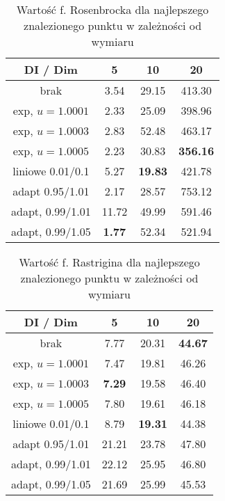 \documentclass[12pt]{article}
\begin{document}
\begin{table}[ht]
	\centering
	\begin{tabular}{|c|c|c|c|}
		\hline
		DI / Dim         & 5             & 10             & 20              \\
		\hline
		brak             & 3.54          & 29.15          & 413.30          \\
		exp, $u=1.0001$  & 2.33          & 25.09          & 398.96          \\
		exp, $u=1.0003$  & 2.83          & 52.48          & 463.17          \\
		exp, $u=1.0005$  & 2.23          & 30.83          & \textbf{356.16} \\
		liniowe 0.01/0.1 & 5.27          & \textbf{19.83} & 421.78          \\
		adapt 0.95/1.01  & 2.17          & 28.57          & 753.12          \\
		adapt, 0.99/1.01 & 11.72         & 49.99          & 591.46          \\
		adapt, 0.99/1.05 & \textbf{1.77} & 52.34          & 521.94          \\
		\hline
	\end{tabular}
	\caption{Wartość f. Rosenbrocka dla najlepszego znalezionego punktu w zależności od wymiaru}
	\label{tab:rosenbrock_values}
\end{table}

\begin{table}[ht]
	\centering
	\begin{tabular}{|c|c|c|c|}
		\hline
		DI / Dim         & 5             & 10             & 20             \\
		\hline
		brak             & 7.77          & 20.31          & \textbf{44.67} \\
		exp, $u=1.0001$  & 7.47          & 19.81          & 46.26          \\
		exp, $u=1.0003$  & \textbf{7.29} & 19.58          & 46.40          \\
		exp, $u=1.0005$  & 7.80          & 19.61          & 46.18          \\
		liniowe 0.01/0.1 & 8.79          & \textbf{19.31} & 44.38          \\
		adapt 0.95/1.01  & 21.21         & 23.78          & 47.80          \\
		adapt, 0.99/1.01 & 22.12         & 25.95          & 46.80          \\
		adapt, 0.99/1.05 & 21.69         & 25.99          & 45.53          \\
		\hline
	\end{tabular}
	\caption{Wartość f. Rastrigina dla najlepszego znalezionego punktu w zależności od wymiaru}
	\label{tab:rastrigin_values}
\end{table}
\end{document}

